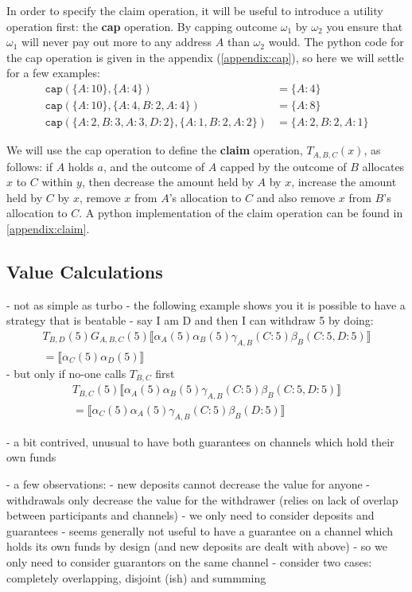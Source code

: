 \documentclass{article}
\theoremstyle{definition}
\newcommand{\adj}[1]{\llbracket #1 \rrbracket}
\begin{document}
In order to specify the claim operation, it will be useful to introduce a utility operation first: the \textbf{cap} operation.
By capping outcome $\omega_1$ by $\omega_2$ you ensure that $\omega_1$ will never pay out more to any address $A$ than $\omega_2$ would.
The python code for the cap operation is given in the appendix (\ref{appendix:cap}), so here we will settle for a few examples:
\begin{align*}
  \texttt{cap}(\{A: 10\}, \{A:4\}) &= \{A: 4 \} \\
  \texttt{cap}(\{A: 10\}, \{A:4, B: 2, A: 4\}) &= \{A: 8 \} \\
  \texttt{cap}(\{A: 2, B: 3, A: 3, D: 2\}, \{A: 1, B: 2, A: 2\}) &= \{A: 2, B: 2, A:1\}
\end{align*}

We will use the cap operation to define the \textbf{claim} operation, $T_{A,B,C}(x)$, as follows: if $A$ holds $a$, and the outcome of $A$ capped by the outcome of $B$ allocates $x$ to $C$ within $y$, then decrease the amount held by $A$ by $x$, increase the amount held by $C$ by $x$, remove $x$ from $A$'s allocation to $C$ and also remove $x$ from $B$'s allocation to $C$. A python implementation of the claim operation can be found in \ref{appendix:claim}.

\subsection{Value Calculations}

- not as simple as turbo
- the following example shows you it is possible to have a strategy that is beatable
- say I am D and then I can withdraw 5 by doing:
\begin{multline*}
  T_{B, D}(5)G_{A, B, C}(5)\adj{\alpha_A(5)\alpha_B(5)\gamma_{A, B}(C: 5)\beta_B(C: 5, D: 5)}\\= \adj{\alpha_C(5)\alpha_D(5)}
\end{multline*}
- but only if no-one calls $T_{B, C}$ first
\begin{multline*}
  T_{B, C}(5)\adj{\alpha_A(5)\alpha_B(5)\gamma_{A, B}(C: 5)\beta_B(C: 5, D: 5)} \\= \adj{\alpha_C(5)\alpha_A(5)\gamma_{A, B}(C: 5)\beta_B(D: 5)}
\end{multline*}

- a bit contrived, unusual to have both guarantees on channels which hold their own funds

- a few observations:
  - new deposits cannot decrease the value for anyone
  - withdrawals only decrease the value for the withdrawer (relies on lack of overlap between participants and channels)
  - we only need to consider deposits and guarantees
  - seems generally not useful to have a guarantee on a channel which holds its own funds by design
    (and new deposits are dealt with above)
  - so we only need to consider guarantors on the same channel
  - consider two cases: completely overlapping, disjoint (ish) and summming
\end{document}
